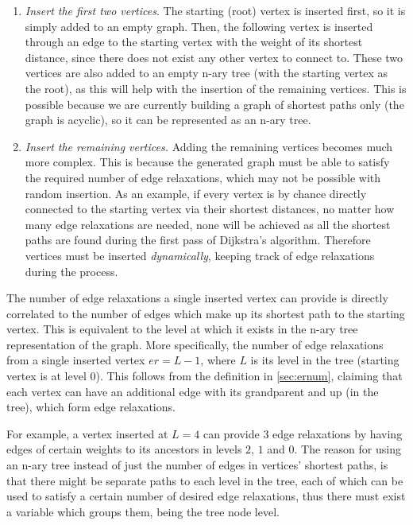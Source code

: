 \documentclass{l4proj}
\begin{document}
\begin{enumerate}[i]
	\item
	\emph{Insert the first two vertices}. The starting (root) vertex is inserted first, so it is simply added to an empty graph. Then, the following vertex is inserted through an edge to the starting vertex with the weight of its shortest distance, since there does not exist any other vertex to connect to. These two vertices are also added to an empty n-ary tree (with the starting vertex as the root), as this will help with the insertion of the remaining vertices. This is possible because we are currently building a graph of shortest paths only (the graph is acyclic), so it can be represented as an n-ary tree.
	\item
	\emph{Insert the remaining vertices.} Adding the remaining vertices becomes much more complex. This is because the generated graph must be able to satisfy the required number of edge relaxations, which may not be possible with random insertion. As an example, if every vertex is by chance directly connected to the starting vertex via their shortest distances, no matter how many edge relaxations are needed, none will be achieved as all the shortest paths are found during the first pass of Dijkstra's algorithm. Therefore vertices must be inserted \emph{dynamically}, keeping track of edge relaxations during the process.
\end{enumerate}

The number of edge relaxations a single inserted vertex can provide is directly correlated to the number of edges which make up its shortest path to the starting vertex. This is equivalent to the level at which it exists in the n-ary tree representation of the graph. More specifically, the number of edge relaxations from a single inserted vertex $er = L-1$, where $L$ is its level in the tree (starting vertex is at level $0$). This follows from the definition in \autoref{sec:ernum}, claiming that each vertex can have an additional edge with its grandparent and up (in the tree), which form edge relaxations. 

For example, a vertex inserted at $L=4$ can provide $3$ edge relaxations by having edges of certain weights to its ancestors in levels $2$, $1$ and $0$. The reason for using an n-ary tree instead of just the number of edges in vertices' shortest paths, is that there might be separate paths to each level in the tree, each of which can be used to satisfy a certain number of desired edge relaxations, thus there must exist a variable which groups them, being the tree node level.
\end{document}
